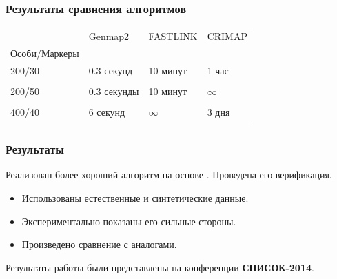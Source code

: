 \documentclass{beamer}
\begin{document}
\begin{frame}
  \frametitle{Результаты сравнения алгоритмов}

  \begin{tabular}{|l|l|l|l|}
    \hline
    & Genmap2 & FASTLINK & CRIMAP \\
    Особи/Маркеры & & & \\
    \hline
    200/30 & 0.3 секунд & 10 минут & 1 час \\
    & & & \\
    \hline
    200/50 & 0.3 секунды & 10 минут & $ \infty $ \\
    & & & \\
    \hline
    400/40 & 6 секунд & $ \infty $ & 3 дня \\
    & & & \\
    \hline
  \end{tabular}
\end{frame}

\begin{frame}
  \frametitle{Результаты}
  Реализован более хороший алгоритм на основе \genmap. Проведена его
  верификация.
  \begin{itemize}
  \item Использованы естественные и синтетические данные.
  \item Экспериментально показаны его сильные стороны.
  \item Произведено сравнение с аналогами.
  \end{itemize}

  \bigskip

  Результаты работы были представлены на конференции
  \textbf{СПИСОК-2014}.
\end{frame}
\end{document}
